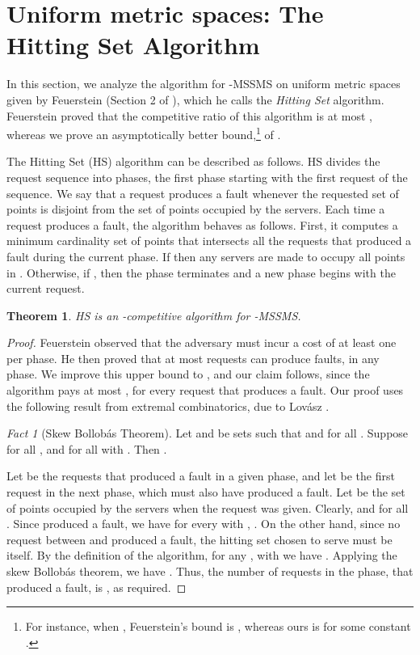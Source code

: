 \documentclass[11pt]{article}
\theoremstyle{plain}\newtheorem{theorem}{Theorem}
\theoremstyle{definition}
\theoremstyle{remark}
\newtheorem{fact}{Fact}
\begin{document}
\section{Uniform metric spaces: The Hitting Set Algorithm}\label{sec_hitting_set}

In this section, 
we analyze the algorithm for -MSSMS on uniform metric spaces given by Feuerstein (Section 2 of \cite{Feuerstein98}), which he calls the \textit{Hitting Set} algorithm. Feuerstein proved that the competitive ratio of this algorithm is at most , whereas we prove an asymptotically better bound,\footnote{For instance, when , Feuerstein's bound is , whereas ours is  for some constant .} of . 


The Hitting Set (HS) algorithm can be described as follows. HS divides the request sequence into phases, the first phase starting with the first request of the sequence. We say that a request produces a fault whenever the requested set of points is disjoint from the set of points occupied by the servers. 
Each time a request produces a fault, the algorithm behaves as follows. First, it computes a minimum cardinality set  of points that intersects all the requests that produced a fault during the current phase. If  then any  servers are made to occupy all points in . Otherwise, if , then the phase terminates and a new phase begins with the current request.


\begin{theorem}
HS is an -competitive algorithm for -MSSMS.
\end{theorem}

\begin{proof}
Feuerstein observed that the adversary must incur a cost of at least one per phase. He then proved that at most  requests can produce faults, in any phase. We improve this upper bound to , and our claim follows, since the algorithm pays at most , for every request that produces a fault. Our proof uses the following result from extremal combinatorics, due to Lov\'{a}sz \cite{Lovasz_skewBollobas}.

\begin{fact}[Skew Bollob\'{a}s Theorem]
Let  and  be sets such that  and  for all . Suppose  for all , and  for all  with . Then .
\end{fact}

Let  be the requests that produced a fault in a given phase, and let  be the first request in the next phase, which must also have produced a fault. Let  be the set of points occupied by the servers when the request  was given. Clearly,  and  for all .
Since  produced a fault, we have for every  with , . 
On the other hand, since no request between  and  produced a fault, the hitting set chosen to serve  must be  itself. By the definition of the algorithm, for any ,  with  we have . 
Applying the skew Bollob\'{a}s theorem, we have . Thus, the number of requests in the phase, that produced a fault, is , as required.
\end{proof}
\end{document}
